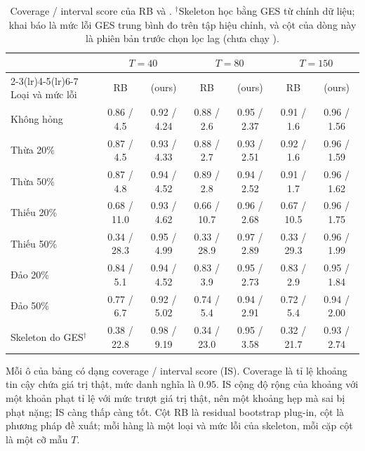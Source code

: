 \begin{table}[H]
\centering\footnotesize
\setlength{\tabcolsep}{3pt}
\begin{tabular}{lcccccc}
\toprule
 & \multicolumn{2}{c}{$T=40$} & \multicolumn{2}{c}{$T=80$} & \multicolumn{2}{c}{$T=150$}\\
\cmidrule(lr){2-3}\cmidrule(lr){4-5}\cmidrule(lr){6-7}
Loại và mức lỗi & RB & \ours{} (ours) & RB & \ours{} (ours) & RB & \ours{} (ours)\\
\midrule
Không hỏng & 0.86 / 4.5 & 0.92 / 4.24 & 0.88 / 2.6 & 0.95 / 2.37 & 0.91 / 1.6 & 0.96 / 1.56 \\
Thừa 20\% & 0.87 / 4.5 & 0.93 / 4.33 & 0.88 / 2.7 & 0.93 / 2.51 & 0.92 / 1.6 & 0.96 / 1.59 \\
Thừa 50\% & 0.87 / 4.8 & 0.94 / 4.52 & 0.89 / 2.8 & 0.94 / 2.52 & 0.91 / 1.7 & 0.96 / 1.62 \\
Thiếu 20\% & 0.68 / 11.0 & 0.93 / 4.62 & 0.66 / 10.7 & 0.96 / 2.68 & 0.67 / 10.5 & 0.96 / 1.75 \\
Thiếu 50\% & 0.34 / 28.3 & 0.95 / 4.99 & 0.33 / 28.9 & 0.97 / 2.89 & 0.33 / 29.3 & 0.96 / 1.99 \\
Đảo 20\% & 0.84 / 5.1 & 0.94 / 4.52 & 0.83 / 3.9 & 0.95 / 2.73 & 0.83 / 2.9 & 0.95 / 1.84 \\
Đảo 50\% & 0.77 / 6.7 & 0.92 / 5.02 & 0.74 / 5.4 & 0.94 / 2.91 & 0.72 / 5.4 & 0.94 / 2.00 \\
Skeleton do GES$^{\dagger}$ & 0.38 / 22.8 & 0.98 / 9.19 & 0.34 / 23.0 & 0.95 / 3.58 & 0.32 / 21.7 & 0.93 / 2.74 \\
\bottomrule
\end{tabular}
\caption{Coverage / interval score của RB và \ours{}. $^{\dagger}$Skeleton học bằng GES từ chính dữ liệu; khai báo là mức lỗi GES trung bình đo trên tập hiệu chỉnh, và cột \ours{} của dòng này là phiên bản trước chọn lọc lag (chưa chạy \ours{}).}\label{tab:full}
\end{table}

Mỗi ô của bảng có dạng coverage / interval score (IS). Coverage là tỉ lệ khoảng tin cậy chứa giá trị thật, mức danh nghĩa là $0.95$. IS cộng độ rộng của khoảng với một khoản phạt tỉ lệ với mức trượt giá trị thật, nên một khoảng hẹp mà sai bị phạt nặng; IS càng thấp càng tốt. Cột RB là residual bootstrap plug-in, cột \ours{} là phương pháp đề xuất; mỗi hàng là một loại và mức lỗi của skeleton, mỗi cặp cột là một cỡ mẫu $T$.

